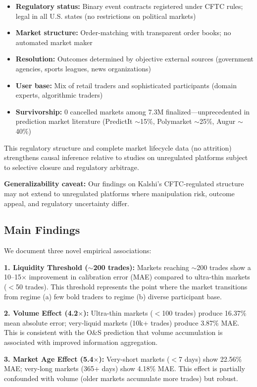 \documentclass[12pt,letterpaper]{article}
\begin{document}
\begin{itemize}[leftmargin=*]
    \item \textbf{Regulatory status:} Binary event contracts registered under CFTC rules; legal in all U.S. states (no restrictions on political markets)
    \item \textbf{Market structure:} Order-matching with transparent order books; no automated market maker
    \item \textbf{Resolution:} Outcomes determined by objective external sources (government agencies, sports leagues, news organizations)
    \item \textbf{User base:} Mix of retail traders and sophisticated participants (domain experts, algorithmic traders)
    \item \textbf{Survivorship:} 0 cancelled markets among 7.3M finalized---unprecedented in prediction market literature (PredictIt $\sim$15\%, Polymarket $\sim$25\%, Augur $\sim$40\%)
\end{itemize}

This regulatory structure and complete market lifecycle data (no attrition) strengthens causal inference relative to studies on unregulated platforms subject to selective closure and regulatory arbitrage.

\textbf{Generalizability caveat:} Our findings on Kalshi's CFTC-regulated structure may not extend to unregulated platforms where manipulation risk, outcome appeal, and regulatory uncertainty differ.

\subsection{Main Findings}

We document three novel empirical associations:

\textbf{1. Liquidity Threshold ($\sim$200 trades):} Markets reaching $\sim$200 trades show a 10--15$\times$ improvement in calibration error (MAE) compared to ultra-thin markets ($<$50 trades). This threshold represents the point where the market transitions from regime (a) few bold traders to regime (b) diverse participant base.

\textbf{2. Volume Effect (4.2$\times$):} Ultra-thin markets ($<$100 trades) produce 16.37\% mean absolute error; very-liquid markets (10k+ trades) produce 3.87\% MAE. This is consistent with the O\&S prediction that volume accumulation is associated with improved information aggregation.

\textbf{3. Market Age Effect (5.4$\times$):} Very-short markets ($<$7 days) show 22.56\% MAE; very-long markets (365+ days) show 4.18\% MAE. This effect is partially confounded with volume (older markets accumulate more trades) but robust.
\end{document}
